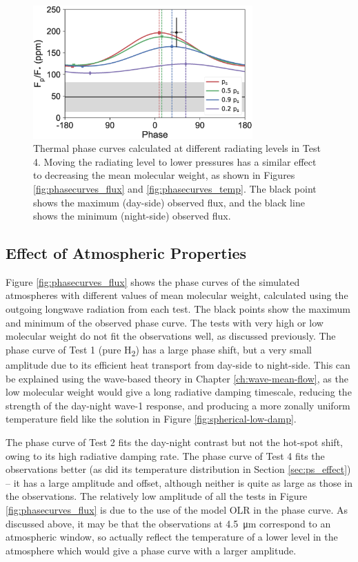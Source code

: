 \begin{figure}
  \centering
    \includegraphics[width=0.75\textwidth]{figures/linking-climate-55cnce/phasecurves_p_level.eps}
    \caption{Thermal phase curves calculated at different radiating levels in Test 4. Moving the radiating level to lower pressures has a similar effect to decreasing the mean molecular weight, as shown in Figures \ref{fig:phasecurves_flux} and \ref{fig:phasecurves_temp}. The black point shows the maximum (day-side) observed flux, and the black line shows the minimum (night-side) observed flux.}
   \label{fig:phasecurves}
\end{figure}

\subsection{Effect of Atmospheric Properties}

Figure \ref{fig:phasecurves_flux} shows the phase curves of the simulated atmospheres with different values of mean molecular weight, calculated using the outgoing longwave radiation from each test. The black points show the maximum and minimum of the observed phase curve. The tests with very high or low molecular weight do not fit the observations well, as discussed previously. The phase curve of Test 1 (pure H\textsubscript{2}) has a large phase shift, but a very small amplitude due to its efficient heat transport from day-side to night-side. This can be explained using the wave-based theory in Chapter \ref{ch:wave-mean-flow}, as the low molecular weight would give a long radiative damping timescale, reducing the strength of the day-night wave-1 response, and producing a more zonally uniform temperature field like the solution in Figure \ref{fig:spherical-low-damp}.

The phase curve of Test 2 fits the day-night contrast but not the hot-spot shift, owing to its high radiative damping rate. The phase curve of Test 4 fits the observations better (as did its temperature distribution in Section \ref{sec:ps_effect}) -- it has a large amplitude and offset, although neither is quite as large as those in the observations. The relatively low amplitude of all the tests in Figure \ref{fig:phasecurves_flux} is due to the use of the model OLR in the phase curve. As discussed above, it may be that the observations at \SI{4.5}{\micro\metre} correspond to an atmospheric window, so actually reflect the temperature of a lower level in the atmosphere which would give a phase curve with a larger amplitude.



